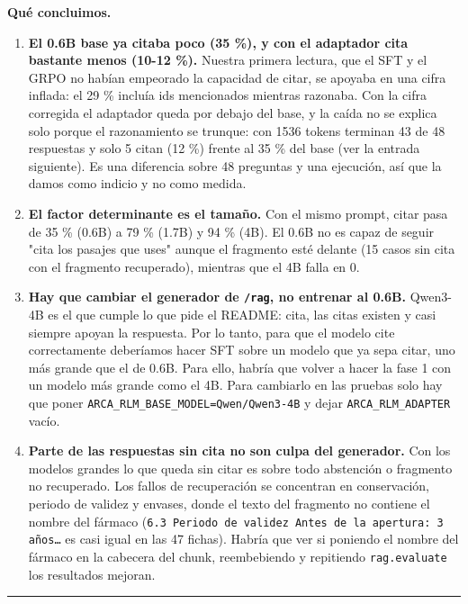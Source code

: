 \textbf{Qué concluimos.}

\begin{enumerate}
\tightlist
\item
  \textbf{El 0.6B base ya citaba poco (35 \%), y con el adaptador cita bastante menos (10-12 \%).}
  Nuestra primera lectura, que el SFT y el GRPO no habían empeorado la capacidad de citar, se
  apoyaba en una cifra inflada: el 29 \% incluía ids mencionados mientras razonaba. Con la cifra
  corregida el adaptador queda por debajo del base, y la caída no se explica solo porque el
  razonamiento se trunque: con 1536 tokens terminan 43 de 48 respuestas y solo 5 citan (12 \%)
  frente al 35 \% del base (ver la entrada siguiente). Es una diferencia sobre 48 preguntas y
  una ejecución, así que la damos como indicio y no como medida.
\item
  \textbf{El factor determinante es el tamaño.} Con el mismo prompt, citar pasa de 35 \% (0.6B) a 79 \%
  (1.7B) y 94 \% (4B). El 0.6B no es capaz de seguir "cita los pasajes que uses" aunque el
  fragmento esté delante (15 casos sin cita con el fragmento recuperado), mientras que el 4B
  falla en 0.
\item
  \textbf{Hay que cambiar el generador de \texttt{/\allowbreak{}rag}, no entrenar al 0.6B.} Qwen3-4B es el que cumple lo
  que pide el README: cita, las citas existen y casi siempre apoyan la respuesta. Por lo tanto, para que el modelo cite correctamente deberíamos hacer SFT sobre un modelo que ya sepa citar, uno más grande que el de 0.6B. Para ello, habría que volver a hacer la fase 1 con un modelo más grande como el 4B. Para cambiarlo en las pruebas solo hay que poner
  \texttt{ARCA\_\allowbreak{}RLM\_\allowbreak{}BASE\_\allowbreak{}MODEL=\allowbreak{}Qwen/\allowbreak{}Qwen3-4B} y dejar \texttt{ARCA\_\allowbreak{}RLM\_\allowbreak{}ADAPTER} vacío.
\item
  \textbf{Parte de las respuestas sin cita no son culpa del generador.} Con los modelos grandes lo que
  queda sin citar es sobre todo abstención o fragmento no recuperado. Los fallos de recuperación
  se concentran en conservación, periodo de validez y envases, donde el texto del fragmento no
  contiene el nombre del fármaco (\texttt{6.3 Periodo de validez \textbar{} Antes de la apertura: 3 años…} es
  casi igual en las 47 fichas). Habría que ver si poniendo el
  nombre del fármaco en la cabecera del chunk, reembebiendo y repitiendo \texttt{rag.evaluate} los resultados mejoran.
\end{enumerate}

\begin{center}\rule{0.5\linewidth}{0.5pt}\end{center}

